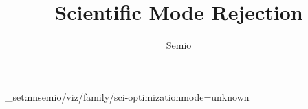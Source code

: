 \documentclass[type=paper,language=en,theme=light]{semio}
\title{Scientific Mode Rejection}
\author{Semio}
\date{}
\begin{document}
\SemioVizProbePage
\ExplSyntaxOn\keys_set:nn{semio/viz/family/sci-optimization}{mode=unknown}\ExplSyntaxOff
{}
\SemioVizProbeEnd
\end{document}
